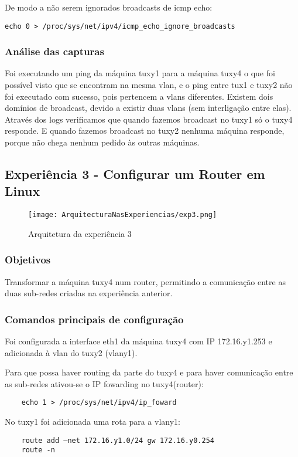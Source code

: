 \documentclass[a4paper]{article}
\begin{document}
De modo a não serem ignorados broadcasts de icmp echo:
\begin{verbatim}
echo 0 > /proc/sys/net/ipv4/icmp_echo_ignore_broadcasts
\end{verbatim}

\subsubsection{Análise das capturas}
Foi executando um ping da máquina tuxy1 para a máquina tuxy4 o que foi possível
visto que se encontram na mesma vlan, e o ping entre tux1 e tuxy2 não foi
executado com sucesso, pois pertencem a vlans diferentes. Existem dois domínios
de broadcast, devido a existir duas vlans (sem interligação entre elas).
Através dos logs verificamos que quando fazemos broadcast no tuxy1 só o tuxy4
responde. E quando fazemos broadcast no tuxy2 nenhuma máquina responde, porque
não chega nenhum pedido às outras máquinas.

\subsection{Experiência 3 - Configurar um Router em Linux}

\begin{figure}[h]
    \centering
    \texttt{[image: ArquitecturaNasExperiencias/exp3.png]}
    \caption{Arquitetura da experiência 3}
\end{figure}

\subsubsection{Objetivos}
Transformar a máquina tuxy4 num router, permitindo a comunicação entre as duas
sub-redes criadas na experiência anterior.

\subsubsection{Comandos principais de configuração}
Foi configurada a interface eth1 da máquina tuxy4 com IP 172.16.y1.253 e
adicionada à vlan do tuxy2 (vlany1).

Para que possa haver routing da parte do tuxy4 e para haver comunicação entre
as sub-redes ativou-se o IP fowarding no tuxy4(router):
\begin{verbatim}
	echo 1 > /proc/sys/net/ipv4/ip_foward
\end{verbatim}

No tuxy1 foi adicionada uma rota para a vlany1:
\begin{verbatim}
	route add –net 172.16.y1.0/24 gw 172.16.y0.254
	route -n
\end{verbatim}
\end{document}
